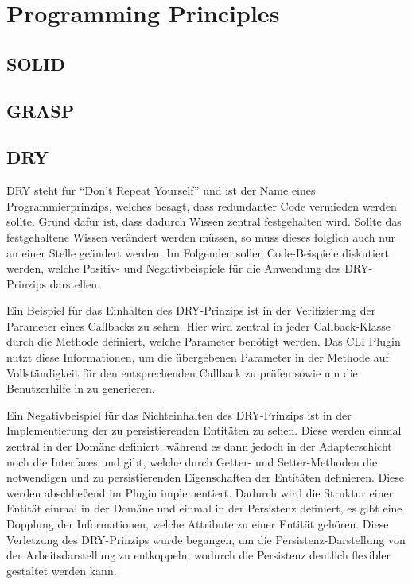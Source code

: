 \chapter{Programming Principles}

\section{SOLID}

\section{GRASP}

\section{DRY}
DRY steht für \enquote{Don't Repeat Yourself} und ist der Name eines Programmierprinzips, welches besagt, dass redundanter Code vermieden werden sollte. Grund dafür ist, dass dadurch Wissen zentral festgehalten wird. Sollte das festgehaltene Wissen verändert werden müssen, so muss dieses folglich auch nur an einer Stelle geändert werden. Im Folgenden sollen Code-Beispiele diskutiert werden, welche Positiv- und Negativbeispiele für die Anwendung des DRY-Prinzips darstellen.

Ein Beispiel für das Einhalten des DRY-Prinzips ist in der Verifizierung der Parameter eines Callbacks zu sehen. Hier wird zentral in jeder Callback-Klasse durch die Methode  definiert, welche Parameter benötigt werden. Das CLI Plugin nutzt diese Informationen, um die übergebenen Parameter in der Methode  auf Vollständigkeit für den entsprechenden Callback zu prüfen sowie um die Benutzerhilfe in  zu generieren.

Ein Negativbeispiel für das Nichteinhalten des DRY-Prinzips ist in der Implementierung der zu persistierenden Entitäten zu sehen. Diese werden einmal zentral in der Domäne definiert, während es dann jedoch in der Adapterschicht noch die Interfaces  und  gibt, welche durch Getter- und Setter-Methoden die notwendigen und zu persistierenden Eigenschaften der Entitäten definieren. Diese werden abschließend im  Plugin implementiert. Dadurch wird die Struktur einer Entität einmal in der Domäne und einmal in der Persistenz definiert, es gibt eine Dopplung der Informationen, welche Attribute zu einer Entität gehören. Diese Verletzung des DRY-Prinzips wurde begangen, um die Persistenz-Darstellung von der Arbeitsdarstellung zu entkoppeln, wodurch die Persistenz deutlich flexibler gestaltet werden kann.

